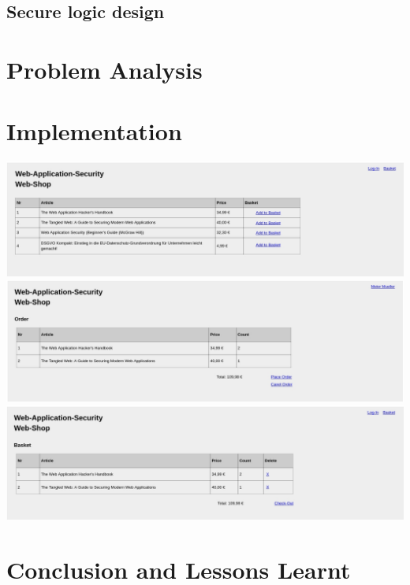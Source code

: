 \documentclass[12pt,a4paper]{article}
\begin{document}
		\subsection{Secure logic design}
		 
	 	
	\section{Problem Analysis}
	
	\section{Implementation}
		
	\includegraphics[scale = 0.5]{index}
	\includegraphics[scale = 0.5]{order}
	\includegraphics[scale = 0.5]{basket}
	
	\section{Conclusion and Lessons Learnt}
\end{document}

